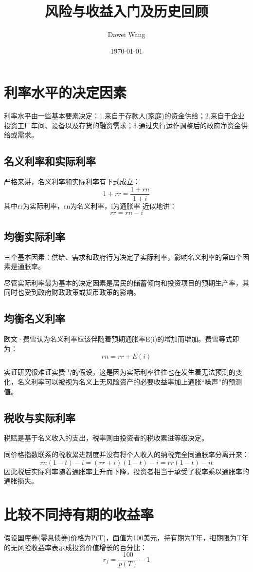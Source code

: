 \documentclass{article}
\title{风险与收益入门及历史回顾}
\author{Dawei Wang}
\date{\today}
\begin{document}
	\maketitle
\section{利率水平的决定因素}
利率水平由一些基本要素决定：1.来自于存款人(家庭)的资金供给；2.来自于企业投资工厂车间、设备以及存货的融资需求；3.通过央行运作调整后的政府净资金供给或需求。

\subsection{名义利率和实际利率}
严格来讲，名义利率和实际利率有下式成立：
\[
1+rr=\frac{1+rn}{1+i}
\]
其中rr为实际利率，rn为名义利率，i为通胀率
近似地讲：
\[
rr=rn-i
\]

\subsection{均衡实际利率}
三个基本因素：供给、需求和政府行为决定了实际利率，影响名义利率的第四个因素是通胀率。

尽管实际利率最为基本的决定因素是居民的储蓄倾向和投资项目的预期生产率，其同时也受到政府财政政策或货币政策的影响。

\subsection{均衡名义利率}
欧文·费雪认为名义利率应该伴随着预期通胀率E(i)的增加而增加。费雪等式即为：
\[
rn=rr+E(i)
\]

实证研究很难证实费雪的假设，这是因为实际利率往往也在发生着无法预测的变化，名义利率可以被视为名义上无风险资产的必要收益率加上通胀“噪声”的预测值。

\subsection{税收与实际利率}
税赋是基于名义收入的支出，税率则由投资者的税收累进等级决定。

同价格指数联系的税收累进制度并没有将个人收入的纳税完全同通胀率分离开来：
\[
rn(1-t)-i=(rr+i)(1-t)-i=rr(1-t)-it
\]
因此税后实际利率随着通胀率上升而下降，投资者相当于承受了税率乘以通胀率的通胀损失。

\section{比较不同持有期的收益率}
假设国库券(零息债券)价格为P(T)，面值为100美元，持有期为T年，把期限为T年的无风险收益率表示成投资价值增长的百分比：
\[
r_f=\frac{100}{p(T)}-1
\]
\end{document}
